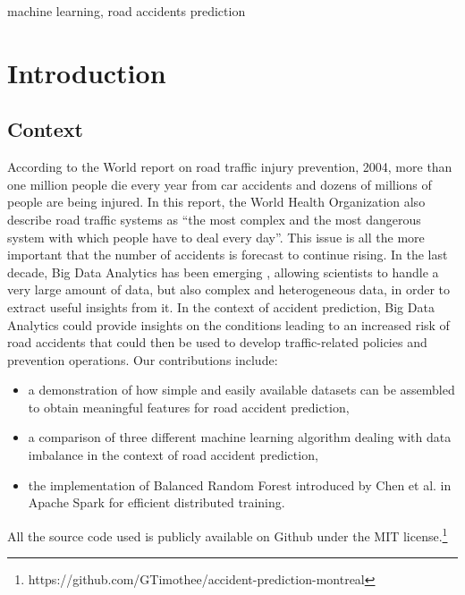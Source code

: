 \documentclass[conference]{IEEEtran}
\begin{document}
\begin{IEEEkeywords}
machine learning, road accidents prediction
\end{IEEEkeywords}

\section{Introduction}
\subsection{Context}
According to the World report on road traffic injury prevention, 2004, more than one million people die every year from car accidents and dozens of millions of people are being injured\cite{Peden2004}. In this report, the World Health Organization also describe road traffic systems as “the most complex and the most dangerous system with which people have to deal every day”. This issue is all the more important that the number of accidents is forecast to continue rising. In the last decade, Big Data Analytics has been emerging \cite{Gandomi2015}, allowing scientists to handle a very large amount of data, but also complex and heterogeneous data, in order to extract useful insights from it. In the context of accident prediction, Big Data Analytics could provide insights on the conditions leading to an increased risk of road accidents that could then be used to develop traffic-related policies and prevention operations. Our contributions include: 
\begin{itemize}
\item a demonstration of how simple and easily available datasets can be assembled to obtain meaningful features for road accident prediction,
\item a comparison of three different machine learning algorithm dealing with data imbalance in the context of road accident prediction,
\item the implementation of Balanced Random Forest introduced by Chen et al.\cite{Chen2004} in Apache Spark for efficient distributed training. 
\end{itemize}
All the source code used is publicly available on Github under the MIT license.\footnote{https://github.com/GTimothee/accident-prediction-montreal}
\end{document}
